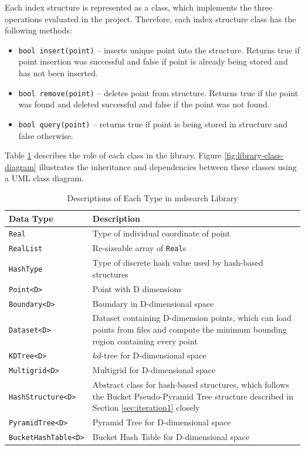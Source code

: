 Each index structure is represented as a class, which implements the three operations evaluated in the project. Therefore, each index structure class has the following methods:
\begin{itemize}
	\item \texttt{bool insert(point)} -- inserts unique point into the structure. Returns true if point insertion was successful and false if point is already being stored and has not been inserted.
	\item \texttt{bool remove(point)} -- deletes point from structure. Returns true if the point was found and deleted successful and false if the point was not found.
	\item \texttt{bool query(point)} -- returns true if point is being stored in structure and false otherwise.
\end{itemize}

Table \ref{tab:library-classes} describes the role of each class in the library. Figure \ref{fig:library-class-diagram} illustrates the inheritance and dependencies between these classes using a UML class diagram.

\begin{table}[H]
	\centering
	\begin{tabular}{|p{4.25cm}|p{9.5cm}|}
		\hline
		\textbf{Data Type} & \textbf{Description} \\
		\hline
		\texttt{Real} & Type of individual coordinate of point \\
		\texttt{RealList} & Re-sizeable array of \texttt{Real}s \\
		\texttt{HashType} & Type of discrete hash value used by hash-based structures \\
		\texttt{Point<D>} & Point with D dimensions \\
		\texttt{Boundary<D>} & Boundary in D-dimensional space \\
		\texttt{Dataset<D>} & Dataset containing D-dimension points, which can load points from files and compute the minimum bounding region containing every point \\
		\texttt{KDTree<D>} & $kd$-tree for D-dimensional space \\
		\texttt{Multigrid<D>} & Multigrid for D-dimensional space \\
		\texttt{HashStructure<D>} & Abstract class for hash-based structures, which follows the Bucket Pseudo-Pyramid Tree structure described in Section \ref{sec:iteration1} closely \\
		\texttt{PyramidTree<D>} & Pyramid Tree for D-dimensional space \\
		\texttt{BucketHashTable<D>} & Bucket Hash Table for D-dimensional space \\
		\hline
	\end{tabular}
	\caption{Descriptions of Each Type in mdsearch Library}
	\label{tab:library-classes}
\end{table}

